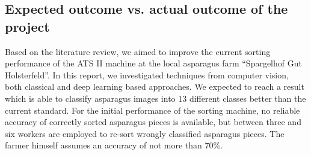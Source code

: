 \subsection{Expected outcome vs. actual outcome of the project}

Based on the literature review, we aimed to improve the current sorting performance of the ATS II machine at the local asparagus farm “Spargelhof Gut Holsterfeld”. In this report, we investigated techniques from computer vision, both classical and deep learning based approaches. We expected to reach a result which is able to classify asparagus images into 13 different classes better than the current standard. For the initial performance of the sorting machine, no reliable accuracy of correctly sorted asparagus pieces is available, but between three and six workers are employed to re-sort wrongly classified asparagus pieces. The farmer himself assumes an accuracy of not more than 70\%. \\
 
